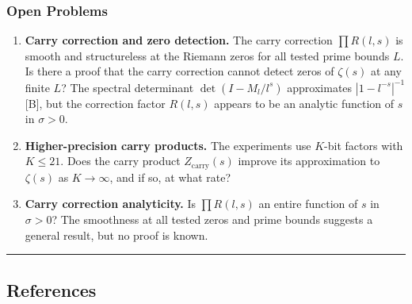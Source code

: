 \documentclass[
  11pt,
]{article}
\begin{document}
\subsubsection{Open Problems}\label{open-problems}

\begin{enumerate}
\def\labelenumi{\arabic{enumi}.}
\item
  \textbf{Carry correction and zero detection.} The carry correction
  \(\prod R(l,s)\) is smooth and structureless at the Riemann zeros for all
  tested prime bounds \(L\). Is there a proof that the carry correction cannot
  detect zeros of \(\zeta(s)\) at any finite \(L\)? The spectral determinant
  \(\det(I - M_l / l^s)\) approximates \(|1 - l^{-s}|^{-1}\) {[}B{]}, but the
  correction factor \(R(l,s)\) appears to be an analytic function of \(s\) in
  \(\sigma > 0\).
\item
  \textbf{Higher-precision carry products.} The experiments use \(K\)-bit
  factors with \(K \leq 21\). Does the carry product \(Z_{\text{carry}}(s)\)
  improve its approximation to \(\zeta(s)\) as \(K \to \infty\), and if so, at
  what rate?
\item
  \textbf{Carry correction analyticity.} Is \(\prod R(l,s)\) an entire function
  of \(s\) in \(\sigma > 0\)? The smoothness at all tested zeros and prime
  bounds suggests a general result, but no proof is known.
\end{enumerate}

\begin{center}\rule{0.5\linewidth}{0.5pt}\end{center}

\newpage

\subsection{References}\label{references}
\end{document}
